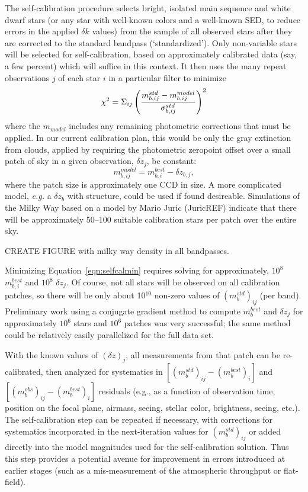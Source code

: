 \documentclass[12pt,preprint]{aastex}
\begin{document}
The self-calibration procedure selects bright, isolated main sequence
and white dwarf stars (or any star with well-known colors and a
well-known SED, to reduce errors in the applied
$\delta k$ values) from the sample of all observed stars after they are
corrected to the standard bandpass (`standardized'). Only non-variable stars will be
selected for self-calibration, based on approximately calibrated data
(say, a few percent) which will suffice in this context. It then uses
the many repeat observations $j$ of each star $i$ in a particular filter to minimize
\begin{equation}
\label{eqn:selfcalmin}
\chi^2 = \Sigma_{ij} \left(  { m_{b,ij}^{std} - m_{b,ij}^{model} \over
    \sigma_{b,ij}^{std} } \right)^2
\end{equation}
where the $m_{model}$ includes any remaining photometric corrections
that must be applied. In our current calibration plan, this would be only the
gray extinction from clouds, applied by requiring the photometric
zeropoint offset over a small patch of sky in a given observation, $\delta z_j$, be constant:
\begin{equation}
\label{eqn:zp}
m^{model}_{b,ij} = m^{best}_{b,i} - \delta z_{b,j},
\end{equation}
where the patch size is approximately one CCD in size. A more
complicated model, {\it e.g.} a $\delta z_{b}$ with structure, could
be used if found desireable. Simulations of the Milky Way based on a
model by Mario Juric (JuricREF) indicate that there will be
approximately 50--100 
suitable calibration stars per patch over the entire sky. 

CREATE FIGURE with milky way density in all bandpasses.

Minimizing Equation~\ref{eqn:selfcalmin} requires solving for
approximately, $10^8$ $m_{b,i}^{best}$ and $10^8$ $\delta z_j$. Of
course, not all stars will be observed on all calibration patches, so
there will be only about 10$^{10}$ non-zero values of
$(m_b^{std})_{ij}$ (per band). Preliminary work using a conjugate
gradient method to compute $m_{b}^{best}$ and $\delta z_j$ for
approximately $10^6$ stars and $10^6$ patches was very successful; the
same method could be relatively easily parallelized for the full data
set. 

With the known values of $(\delta z)_j$, all measurements from that
patch can be re-calibrated, then analyzed for systematics in
$[(m_b^{std})_{ij} - (m_b^{best})_{i}]$ and $[(m_b^{obs})_{ij} -
(m_b^{best})_{i}]$ residuals (e.g., as a function of observation time,
position on the focal plane, airmass, seeing, stellar color,
brightness, seeing, etc.). The self-calibration step can be repeated
if necessary, with corrections for systematics incorporated in the
next-iteration values for $(m_b^{std})_{ij}$ or added directly into
the model magnitudes used for the self-calibration solution. Thus this
step provides a potential avenue for improvement in errors introduced
at earlier stages (such as a mis-measurement of the atmospheric
throughput or flat-field). 
\end{document}
